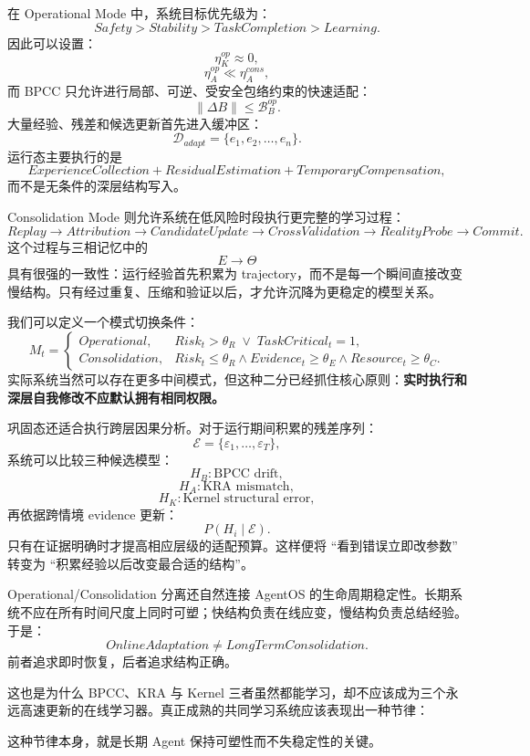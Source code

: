 在 Operational Mode 中，系统目标优先级为：
\[
Safety
>
Stability
>
TaskCompletion
>
Learning.
\]
因此可以设置：
\[
\eta_K^{op}\approx0,
\]
\[
\eta_A^{op}\ll\eta_A^{cons},
\]
而 BPCC 只允许进行局部、可逆、受安全包络约束的快速适配：
\[
\|\Delta B\|
\leq
\mathcal B_B^{op}.
\]
大量经验、残差和候选更新首先进入缓冲区：
\[
\mathcal D_{adapt}
=
\{e_1,e_2,\ldots,e_n\}.
\]
运行态主要执行的是
\[
ExperienceCollection
+
ResidualEstimation
+
TemporaryCompensation,
\]
而不是无条件的深层结构写入。

Consolidation Mode 则允许系统在低风险时段执行更完整的学习过程：
\[
Replay
\rightarrow
Attribution
\rightarrow
CandidateUpdate
\rightarrow
CrossValidation
\rightarrow
RealityProbe
\rightarrow
Commit.
\]
这个过程与三相记忆中的
\[
E\rightarrow\Theta
\]
具有很强的一致性：运行经验首先积累为 trajectory，而不是每一个瞬间直接改变慢结构。只有经过重复、压缩和验证以后，才允许沉降为更稳定的模型关系。

我们可以定义一个模式切换条件：
\[
M_t
=
\begin{cases}
Operational,
&
Risk_t>\theta_R
\;\lor\;
TaskCritical_t=1,
\\[4pt]
Consolidation,
&
Risk_t\leq\theta_R
\land
Evidence_t\geq\theta_E
\land
Resource_t\geq\theta_C.
\end{cases}
\]
实际系统当然可以存在更多中间模式，但这种二分已经抓住核心原则：\textbf{实时执行和深层自我修改不应默认拥有相同权限。}

巩固态还适合执行跨层因果分析。对于运行期间积累的残差序列：
\[
\mathcal E
=
\{\varepsilon_1,\ldots,\varepsilon_T\},
\]
系统可以比较三种候选模型：
\[
H_B:
\text{BPCC drift},
\]
\[
H_A:
\text{KRA mismatch},
\]
\[
H_K:
\text{Kernel structural error},
\]
再依据跨情境 evidence 更新：
\[
P(H_i\mid\mathcal E).
\]
只有在证据明确时才提高相应层级的适配预算。这样便将 ``看到错误立即改参数'' 转变为 ``积累经验以后改变最合适的结构''。

Operational/Consolidation 分离还自然连接 AgentOS 的生命周期稳定性。长期系统不应在所有时间尺度上同时可塑；快结构负责在线应变，慢结构负责总结经验。于是：
\[
\boxed{
OnlineAdaptation
\neq
LongTermConsolidation.
}
\]
前者追求即时恢复，后者追求结构正确。

这也是为什么 BPCC、KRA 与 Kernel 三者虽然都能学习，却不应该成为三个永远高速更新的在线学习器。真正成熟的共同学习系统应该表现出一种节律：
\begin{statementbox}
\centering
{}
\end{statementbox}
这种节律本身，就是长期 Agent 保持可塑性而不失稳定性的关键。

